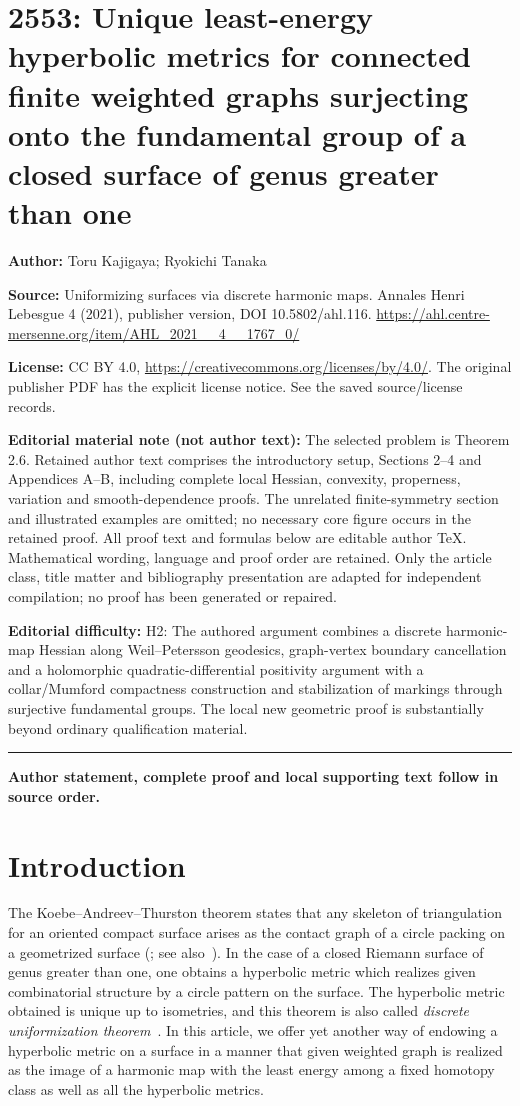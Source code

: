 \documentclass[11pt]{article}
\theoremstyle{definition}
\numberwithin{equation}{section}
\begin{document}
\section*{2553: Unique least-energy hyperbolic metrics for connected finite weighted graphs surjecting onto the fundamental group of a closed surface of genus greater than one}
\noindent\textbf{Author:} Toru Kajigaya; Ryokichi Tanaka\par\noindent\textbf{Source:} Uniformizing surfaces via discrete harmonic maps. Annales Henri Lebesgue 4 (2021), publisher version, DOI 10.5802/ahl.116. \url{https://ahl.centre-mersenne.org/item/AHL_2021__4__1767_0/}
\par\noindent\textbf{License:} CC BY 4.0, \url{https://creativecommons.org/licenses/by/4.0/}. The original publisher PDF has the explicit license notice. See the saved source/license records.
\par\noindent\textbf{Editorial material note (not author text):} The selected problem is Theorem 2.6. Retained author text comprises the introductory setup, Sections 2--4 and Appendices A--B, including complete local Hessian, convexity, properness, variation and smooth-dependence proofs. The unrelated finite-symmetry section and illustrated examples are omitted; no necessary core figure occurs in the retained proof. All proof text and formulas below are editable author TeX. Mathematical wording, language and proof order are retained. Only the article class, title matter and bibliography presentation are adapted for independent compilation; no proof has been generated or repaired.
\par\noindent\textbf{Editorial difficulty:} H2: The authored argument combines a discrete harmonic-map Hessian along Weil–Petersson geodesics, graph-vertex boundary cancellation and a holomorphic quadratic-differential positivity argument with a collar/Mumford compactness construction and stabilization of markings through surjective fundamental groups. The local new geometric proof is substantially beyond ordinary qualification material.
\medskip\hrule\medskip
\noindent\textbf{Author statement, complete proof and local supporting text follow in source order.}
\section{Introduction}


The Koebe--Andreev--Thurston theorem states that any skeleton of triangulation for an oriented compact surface arises as the contact graph of a circle packing on a geometrized surface (\cite[Section~13.7]{Thurston}; see also~\cite{ColindeVerdiere}). In the case of a closed Riemann surface of genus greater than one, one obtains a hyperbolic metric which realizes given combinatorial structure by a circle pattern on the surface. The hyperbolic metric obtained is unique up to isometries, and this theorem is also called \emph{discrete uniformization theorem}~\cite[Chapter~4]{Stephenson}. In this article, we offer yet another way of endowing a hyperbolic metric on a surface in a manner that given weighted graph is realized as the image of a harmonic map with the least energy among a fixed homotopy class as well as all the hyperbolic metrics.
\end{document}
